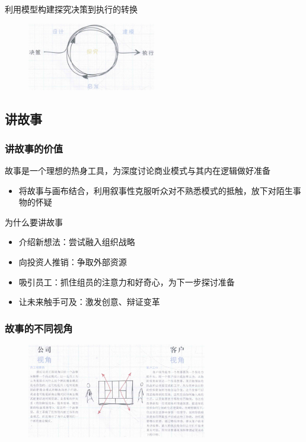 利用模型构建探究决策到执行的转换
\begin{figure}[H]
	\centering
	\vspace{-0.5em}
	\includegraphics[width=0.5\textwidth]{img/利用模型构建探究决策到执行的转换.png}
    \vspace{-0.5em}
\end{figure}


\subsection{讲故事}

\subsubsection{讲故事的价值}
故事是一个理想的热身工具，为深度讨论商业模式与其内在逻辑做好准备
\begin{itemize}
    \item 将故事与画布结合，利用叙事性克服听众对不熟悉模式的抵触，放下对陌生事物的怀疑
\end{itemize}

为什么要讲故事
\begin{itemize}
    \item 介绍新想法：尝试融入组织战略
    \item 向投资人推销：争取外部资源
    \item 吸引员工：抓住组员的注意力和好奇心，为下一步探讨准备
    \item 让未来触手可及：激发创意、辩证变革
\end{itemize}

\subsubsection{故事的不同视角}
\begin{figure}[H]
	\centering
	\vspace{-0.5em}
	\includegraphics[width=0.7\textwidth]{img/故事的不同视角.png}
    \vspace{-0.5em}
\end{figure}

